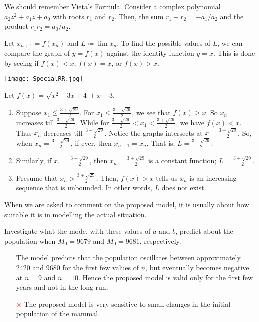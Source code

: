 \documentclass[oneside]{book}
\begin{document}
\begin{note}\hypertarget{vieta}{}
  We should remember Vieta's Formula. Consider a complex polynomial \(a_2 z^2+a_1 z+a_0\) with roots \(r_1\) and \(r_2\). Then, the sum \(r_1+r_2=-a_1/a_2\) and the product \(r_1r_2=a_0/a_2\).
\end{note}
\begin{note}
  Let \(x_{n+1}=f(x_n)\) and \(L\coloneq \lim{x_n}\). To find the possible values of \(L\), we can compare the graph of \(y=f(x)\) against the identity function \(y=x\). This is done by seeing if \(f(x)<x\), \(f(x)=x\), or \(f(x)>x\).
\end{note}
\begin{example}{}{}
  \begin{center}
    \texttt{[image: SpecialRR.jpg]}
  \end{center}
  Let \(f(x)=\sqrt{x^2-3x+4}+x-3\).
  \begin{enumerate}
    \item Suppose \(x_1 \leq \frac{3+\sqrt{29}}{2}\). For \(x_1<\frac{3-\sqrt{29}}{2}\), we see that \(f(x)>x\). So \(x_n\) increases till \(\frac{3-\sqrt{29}}{2}\). While for \(\frac{3-\sqrt{29}}{2}<x_1<\frac{3+\sqrt{29}}{2}\), we have \(f(x)<x\). Thus \(x_n\) decreases till \(\frac{3-\sqrt{29}}{2}\). Notice the graphs intersects at \(x=\frac{3-\sqrt{29}}{2}\). So, when \(x_n=\frac{3-\sqrt{29}}{2}\), if ever, then \(x_{n+1}=x_n\). That is, \(L=\frac{3-\sqrt{29}}{2}\).
    \item Similarly, if \(x_1=\frac{3+\sqrt{29}}{2}\), then \(x_n=\frac{3+\sqrt{29}}{2}\) is a constant function; \(L=\frac{3+\sqrt{29}}{2}\).
    \item Presume that \(x_n>\frac{3+\sqrt{29}}{2}\). Then, \(f(x)>x\) tells us \(x_n\) is an increasing sequence that is unbounded. In other words, \(L\) does not exist.
  \end{enumerate}
\end{example}
\begin{note}
  When we are asked to comment on the proposed model, it is usually about how suitable it is in modelling the actual situation.
\end{note}
\begin{example}{}{}
  Investigate what the mode, with these values of \(a\) and \(b\), predict about the population when \(M_0=9679\) and \(M_0=9681\), respectively. 
  \begin{enumerate}
    \item[\textcolor{green!70!black}{\checkmark}] The model predicts that the population oscillates between  approximately 2420 and 9680 for the first few values of \(n\), but eventually becomes negative at \(n=9\) and \(n=10\). Hence the proposed model is valid only for the first few years and not in the long run. 
    \item[\textcolor{red}{\(\times\)}] The proposed model is very sensitive to small changes in the initial population of the mammal. 
  \end{enumerate}
\end{example}
\end{document}
